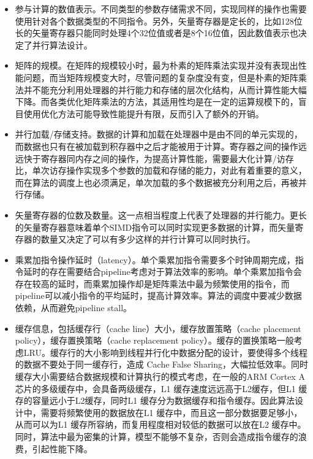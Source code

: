 \begin{itemize}

  \item 参与计算的数值表示。不同类型的参数存储需求不同，实现同样的操作也需要使用针对各个数据类型的不同指令。另外，矢量寄存器是定长的，比如128位长的矢量寄存器只能同时处理4个32位值或者是8个16位值，因此数值表示也决定了并行算法设计。
  \item 矩阵的规模。在矩阵的规模较小时，最为朴素的矩阵乘法实现并没有表现出性能问题，而当矩阵规模变大时，尽管问题的复杂度没有变，但是朴素的矩阵乘法并不能充分利用处理器的并行能力和存储的层次化结构，从而计算性能大幅下降。而各类优化矩阵乘法的方法，其适用性均是在一定的运算规模下的，盲目使用优化方法可能导致性能提升有限，反而引入了额外的开销。
  \item 并行加载/存储支持。数据的计算和加载在处理器中是由不同的单元实现的，而数据也只有在被加载到积存器中之后才能被用于计算。寄存器之间的操作远远快于寄存器同内存之间的操作，为提高计算性能，需要最大化计算/访存比，单次访存操作实现多个参数的加载和存储的能力，对此有着重要的意义，而在算法的调度上也必须满足，单次加载的多个数据被充分利用之后，再被并行存储。
  \item 矢量寄存器的位数及数量。这一点相当程度上代表了处理器的并行能力。更长的矢量寄存器意味着单个SIMD指令可以同时实现更多数据的计算，而矢量寄存器的数量又决定了可以有多少这样的并行计算可以同时执行。
  \item 乘累加指令操作延时（latency）。单个乘累加指令需要多个时钟周期完成，指令延时的存在需要结合pipeline考虑对于算法效率的影响。单个乘累加指令会存在较高的延时，而乘累加操作却是矩阵乘法中最为频繁使用的指令，而pipeline可以减小指令的平均延时，提高计算效率。算法的调度中要减少数据依赖，从而避免pipeline stall。
  \item 缓存信息，包括缓存行（cache line）大小，缓存放置策略（cache placement policy），缓存置换策略（cache replacement policy）。缓存的置换策略一般考虑LRU。缓存行的大小影响到线程并行化中数据分配的设计，要使得多个线程的数据不要处于同一缓存行，造成 Cache False Sharing，大幅拉低效率。同时缓存大小需要结合数据规模和计算执行的模式考虑，在一般的ARM Cortex A 芯片的多级缓存中，会具备两级缓存，L1 缓存速度远远高于L2缓存，但L1 缓存的容量远小于L2缓存，同时L1 缓存分为数据缓存和指令缓存。因此算法设计中，需要将频繁使用的数据放在L1 缓存中，而且这一部分数据要足够小，从而可以为L1 缓存所容纳，而复用程度相对较低的数据可以放在L2 缓存中。同时，算法中最为密集的计算，模型不能够不复杂，否则会造成指令缓存的浪费，引起性能下降。

\end{itemize}

